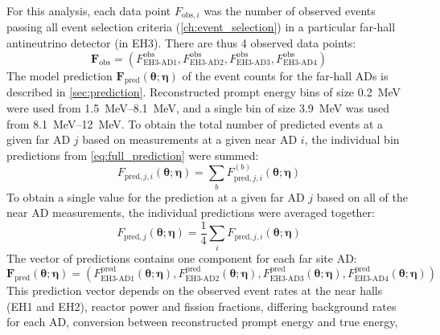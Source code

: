 For this analysis, each data point $F_{\text{obs},i}$
was the number of observed events passing all event selection criteria
(\cref{ch:event_selection})
in a particular far-hall antineutrino detector (in EH3).
There are thus 4 observed data points:
\begin{equation}
    \mathbf{F}_{\text{obs}} =
    (F^{\text{obs}}_{\text{EH3-AD1}},
    F^{\text{obs}}_{\text{EH3-AD2}},
    F^{\text{obs}}_{\text{EH3-AD3}},
    F^{\text{obs}}_{\text{EH3-AD4}})
\end{equation}
The model prediction
$\mathbf{F}_{\text{pred}}(\boldsymbol{\theta};\boldsymbol{\eta})$
of the event counts for the far-hall ADs
is described in \cref{sec:prediction}.
Reconstructed prompt energy bins of size \SI{0.2}{\MeV} were used from \SIrange{1.5}{8.1}{\MeV},
and a single bin of size \SI{3.9}{\MeV} was used from \SIrange{8.1}{12}{\MeV}.
To obtain the total number of predicted events at a given far AD $j$
based on measurements at a given near AD $i$,
the individual bin predictions from \cref{eq:full_prediction} were summed:
\begin{equation}\label{eq:hybrid_rate_shape}
    F_{\text{pred},j,i}(\boldsymbol{\theta};\boldsymbol{\eta}) =
    \sum_b F_{\text{pred},j,i}^{(b)}(\boldsymbol{\theta};\boldsymbol{\eta})
\end{equation}
To obtain a single value for the prediction at a given far AD $j$
based on all of the near AD measurements,
the individual predictions were averaged together:
\begin{equation}\label{eq:average_near}
    F_{\text{pred},j}(\boldsymbol{\theta};\boldsymbol{\eta}) =
    \frac{1}{4} \sum_i
    F_{\text{pred},j,i}(\boldsymbol{\theta};\boldsymbol{\eta})
\end{equation}
The vector of predictions contains one component for each far site AD:
\begin{equation}\label{eq:f_pred_vector}
    \mathbf{F}_\text{pred}(\boldsymbol{\theta};\boldsymbol{\eta}) =
    (
    F^{\text{pred}}_{\text{EH3-AD1}}(\boldsymbol{\theta};\boldsymbol{\eta}),
    F^{\text{pred}}_{\text{EH3-AD2}}(\boldsymbol{\theta};\boldsymbol{\eta}),
    F^{\text{pred}}_{\text{EH3-AD3}}(\boldsymbol{\theta};\boldsymbol{\eta}),
    F^{\text{pred}}_{\text{EH3-AD4}}(\boldsymbol{\theta};\boldsymbol{\eta})
    )
\end{equation}
This prediction vector depends on the observed event rates at the near halls (EH1 and EH2),
reactor power and fission fractions,
differing background rates for each AD,
conversion between reconstructed prompt energy and true \nuebar{} energy,

